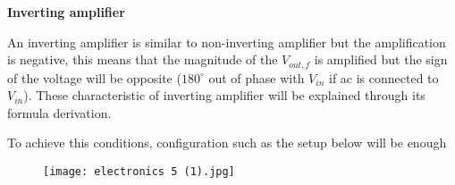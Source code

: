 \documentclass{article}
\begin{document}
 \begin{flushleft}
 \textbf{Inverting amplifier}
 \end{flushleft}
 
 An inverting amplifier is similar to non-inverting amplifier but the amplification is negative, this means that the magnitude of the $V_{out,f}$ is amplified but the sign of the voltage will be opposite ($180^{\circ}$ out of phase with  $V_{in}$ if ac is connected to $V_{in}$). These characteristic of inverting amplifier will be explained through its formula derivation.
 
 To achieve this conditions, configuration such as the setup below will be enough 
 \begin{figure}[H]
     \centering
     \texttt{[image: electronics 5 (1).jpg]}
 \end{figure}
 
\end{document}
